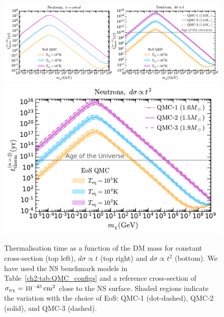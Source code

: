 \begin{figure}[t!bp]
\centering 
  \includegraphics[width=\textwidth]{ttherm_mdm_n0_n1.pdf}
  \includegraphics[width=.525\textwidth]{ttherm_n2_eos.pdf}
  \caption[Thermalisation time as a function of the DM mass for constant cross-section (top left), $d\sigma \propto t$ (top right)  and $d\sigma\propto t^2$ (bottom).]{Thermalisation time as a function of the DM mass for constant cross-section (top left), $d\sigma \propto t$ (top right)  and $d\sigma\propto t^2$ (bottom). We have used the NS benchmark models in Table~\ref{ch2:tab:QMC_configs} and a reference cross-section of $\sigma_{\rm n\chi}= 10^{-45}{\rm \,cm}^2$ close to the NS surface. Shaded regions indicate the variation with the choice of EoS: QMC-1 (dot-dashed), QMC-2 (solid), and QMC-3 (dashed). 
  }
  \label{ch6:fig:thermtime}
\end{figure}


